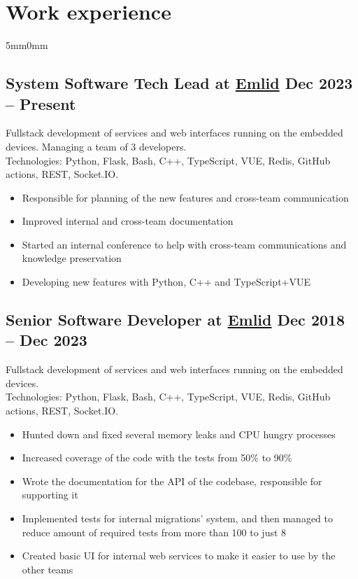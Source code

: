 \documentclass[10pt]{article}
\newcommand{\lmvalue}{5mm}
\newcommand{\rmvalue}{0mm}
\begin{document}
\section*{Work experience}
\begin{changemargin}{\lmvalue}{\rmvalue}
	\subsection*{System Software Tech Lead at \href{https://emlid.com}{Emlid}
		\hfill {\color{gray}Dec 2023 – Present}}
	Fullstack development of services and web interfaces running on the embedded devices.
	Managing a team of 3 developers.\\
	Technologies: Python, Flask, Bash, C++, TypeScript, VUE, Redis, GitHub actions, REST, Socket.IO\@.
	\begin{itemize}
		\item Responsible for planning of the new features and cross-team communication
		\item Improved internal and cross-team documentation
		\item Started an internal conference to help with cross-team communications and knowledge preservation
		\item Developing new features with Python, C++ and TypeScript+VUE
	\end{itemize}
	\subsection*{Senior Software Developer at \href{https://emlid.com}{Emlid}
		\hfill {\color{gray}Dec 2018 – Dec 2023}}
	Fullstack development of services and web interfaces running on the embedded devices.\\
	Technologies: Python, Flask, Bash, C++, TypeScript, VUE, Redis, GitHub actions, REST, Socket.IO\@.
	\begin{itemize}
		\item Hunted down and fixed several memory leaks and CPU hungry processes
		\item Increased coverage of the code with the tests from 50\% to 90\%
		\item Wrote the documentation for the API of the codebase, responsible for supporting it
		\item Implemented tests for internal migrations' system, and then managed to reduce amount of required tests from more than 100 to just 8
		\item Created basic UI for internal web services to make it easier to use by the other teams
	\end{itemize}


\end{changemargin}
\end{document}
